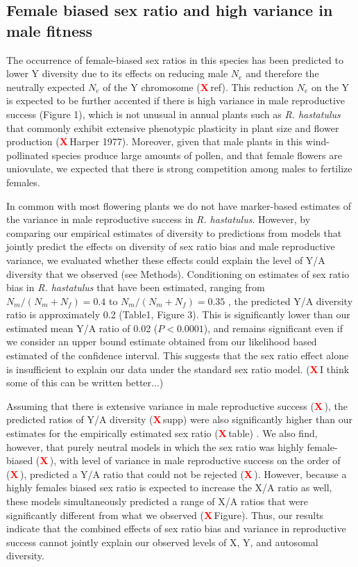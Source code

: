 \documentclass[9pt,twocolumn,twoside]{gsajnl}
\newcommand{\X}{\textcolor{red}{\bf X\,}}
\begin{document}
\subsection*{Female biased sex ratio and high variance in male fitness}

 The occurrence of female-biased sex ratios in this species has been predicted to lower Y diversity due to its effects on reducing male $N_{e}$ and therefore the neutrally expected $N_{e}$ of the Y chromosome (\X ref). This reduction $N_{e}$ on the Y is expected to be further accented if there is high variance in male reproductive success (Figure 1), which is not unusual in annual plants such as \textit{R. hastatulus} that commonly exhibit extensive phenotypic plasticity in plant size and flower production (\X Harper 1977). Moreover, given that male plants in this wind-pollinated species produce large amounts of pollen, and that female flowers are uniovulate, we expected that there is strong competition among males to fertilize females.

 In common with most flowering plants we do not have marker-based estimates of the variance in male reproductive success in \textit{R. hastatulus}. However, by comparing our empirical estimates of diversity to predictions from models that jointly predict the effects on diversity of sex ratio bias and male reproductive variance, we evaluated whether these effects could explain the level of Y/A diversity that we observed (see Methods). Conditioning on estimates of sex ratio bias in \textit{R. hastatulus} that have been estimated, ranging from $N_{m}/(N_{m}+N_{f})=0.4$ to $N_{m}/(N_{m}+N_{f})=0.35$ \citep{pickup2013influence}, the predicted Y/A diversity ratio  is approximately 0.2 (Table1, Figure 3). This is significantly lower than our estimated mean Y/A ratio of 0.02 ($\textit{P}<0.0001$), and remains significant even if we consider an upper bound estimate obtained from our likelihood based estimated of the confidence interval. This suggests that the sex ratio effect alone is insufficient to explain our data under the standard sex ratio model. (\X I think some of this can be written better...)

Assuming that there is extensive variance in male reproductive success (\X), the predicted ratios of Y/A diversity (\X supp) were also significantly higher than our estimates for the empirically estimated sex ratio (\X table) . We also find, however, that purely neutral models in which the sex ratio was highly female-biased (\X), with level of variance in male reproductive success on the order of (\X), predicted a Y/A ratio that could not be rejected (\X). However, because a highly females biased sex ratio is expected to increase the X/A ratio as well, these models simultaneously predicted a range of X/A ratios that were significantly different from what we observed (\X Figure). Thus, our results indicate that the combined effects of sex ratio bias and variance in reproductive success cannot jointly explain our observed levels of X, Y, and autosomal diversity.
\end{document}
